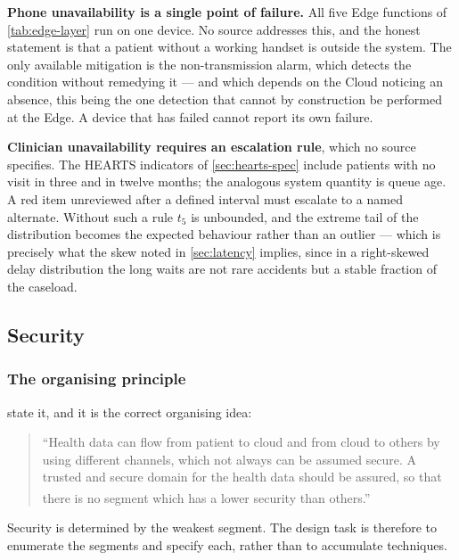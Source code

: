 \documentclass[12pt,a4paper,oneside]{report}
\newcommand{\bq}[1]{``#1''\textsuperscript{\dag}}
\begin{document}
\textbf{Phone unavailability is a single point of failure.} All five Edge functions of \cref{tab:edge-layer} run on one device. No source addresses this, and the honest statement is that a patient without a working handset is outside the system. The only available mitigation is the non-transmission alarm, which detects the condition without remedying it --- and which depends on the Cloud noticing an absence, this being the one detection that cannot by construction be performed at the Edge. A device that has failed cannot report its own failure.

\textbf{Clinician unavailability requires an escalation rule}, which no source specifies. The HEARTS indicators of \cref{sec:hearts-spec} include patients with no visit in three and in twelve months; the analogous system quantity is queue age. A red item unreviewed after a defined interval must escalate to a named alternate. Without such a rule $t_5$ is unbounded, and the extreme tail of the \textcite{bediang2021} distribution becomes the expected behaviour rather than an outlier --- which is precisely what the skew noted in \cref{sec:latency} implies, since in a right-skewed delay distribution the long waits are not rare accidents but a stable fraction of the caseload.

\subsection{Security}\label{sec:security-design}

\subsubsection{The organising principle}

\Textcite{mucchi2021} state it, and it is the correct organising idea:

\begin{quote}\small
\bq{Health data can flow from patient to cloud and from cloud to others by using different channels, which not always can be assumed secure. A trusted and secure domain for the health data should be assured, so that there is no segment which has a lower security than others.}
\end{quote}

Security is determined by the weakest segment. The design task is therefore to enumerate the segments and specify each, rather than to accumulate techniques.
\end{document}
